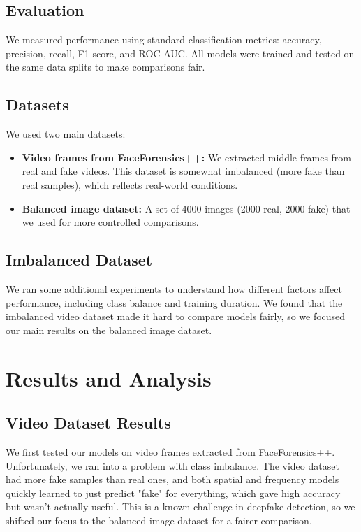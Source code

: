 \documentclass{article}
\begin{document}
\subsection{Evaluation}

We measured performance using standard classification metrics: accuracy, precision, recall, F1-score, and ROC-AUC. All models were trained and tested on the same data splits to make comparisons fair.

\subsection{Datasets}

We used two main datasets:
\begin{itemize}
  \item \textbf{Video frames from FaceForensics++:} We extracted middle frames from real and fake videos. This dataset is somewhat imbalanced (more fake than real samples), which reflects real-world conditions.
  \item \textbf{Balanced image dataset:} A set of 4000 images (2000 real, 2000 fake) that we used for more controlled comparisons.
\end{itemize}

\subsection{Imbalanced Dataset}

We ran some additional experiments to understand how different factors affect performance, including class balance and training duration. We found that the imbalanced video dataset made it hard to compare models fairly, so we focused our main results on the balanced image dataset.

\section{Results and Analysis}

\subsection{Video Dataset Results}

We first tested our models on video frames extracted from FaceForensics++. Unfortunately, we ran into a problem with class imbalance. The video dataset had more fake samples than real ones, and both spatial and frequency models quickly learned to just predict "fake" for everything, which gave high accuracy but wasn't actually useful. This is a known challenge in deepfake detection, so we shifted our focus to the balanced image dataset for a fairer comparison.
\end{document}
